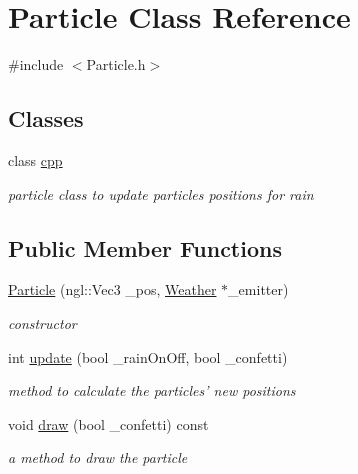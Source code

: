\hypertarget{classParticle}{
\section{Particle Class Reference}
\label{classParticle}
}


{\ttfamily \#include $<$Particle.h$>$}\subsection*{Classes}
\begin{DoxyCompactItemize}
\item 
class \hyperlink{classParticle_1_1cpp}{cpp}
\begin{DoxyCompactList}\small\item\em particle class to update particles positions for rain \item\end{DoxyCompactList}\end{DoxyCompactItemize}
\subsection*{Public Member Functions}
\begin{DoxyCompactItemize}
\item 
\hyperlink{classParticle_a46486946487f51b9f8b2095c61f6dfaa}{Particle} (ngl::Vec3 \_\-pos, \hyperlink{classWeather}{Weather} $\ast$\_\-emitter)
\begin{DoxyCompactList}\small\item\em constructor \item\end{DoxyCompactList}\item 
int \hyperlink{classParticle_a6633cb40b4601a8155f02513c36f41ce}{update} (bool \_\-rainOnOff, bool \_\-confetti)
\begin{DoxyCompactList}\small\item\em method to calculate the particles' new positions \item\end{DoxyCompactList}\item 
void \hyperlink{classParticle_ac38af466dd01764587bc00ee7b6a2e90}{draw} (bool \_\-confetti) const 
\begin{DoxyCompactList}\small\item\em a method to draw the particle \item\end{DoxyCompactList}\end{DoxyCompactItemize}


